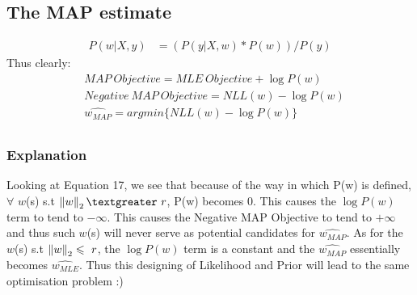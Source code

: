 \documentclass[a4paper,11pt]{article}
\begin{document}
\begin{mlsolution}
\subsection*{The MAP estimate}
\begin{align}
    P(w|X,y) &= (P(y|X,w) * P(w))/P(y)
\end{align}
Thus clearly:
\begin{align}
    &MAP \ Objective = MLE \ Objective + \log{P(w)}\\
    &Negative \ MAP \ Objective = NLL(w) - \log{P(w)}\\
    &\hat{w_{MAP}} = argmin \{ NLL(w) - \log{P(w)}\}\\ 
\end{align}
\subsubsection*{Explanation}
Looking at Equation 17, we see that because of the way in which P(w) is defined, $\forall$ $w$(s) s.t $\norm{w}_{2} \textgreater \ r$, P(w) becomes 0. This causes the $\log{P(w)}$ term to tend to $- \infty$. This causes the Negative MAP Objective to tend to $+ \infty$ and thus such $w$(s) will never serve as potential candidates for $\hat{w_{MAP}}$. As for the $w$(s) s.t $\left\| {w} \right\|_{2} \leqslant \ r$, the $\log{P(w)}$ term is a constant and the $\hat{w_{MAP}}$ essentially becomes $\hat{w_{MLE}}$. Thus this designing of Likelihood and Prior will lead to the same optimisation problem :)  

\end{mlsolution}
\end{document}
